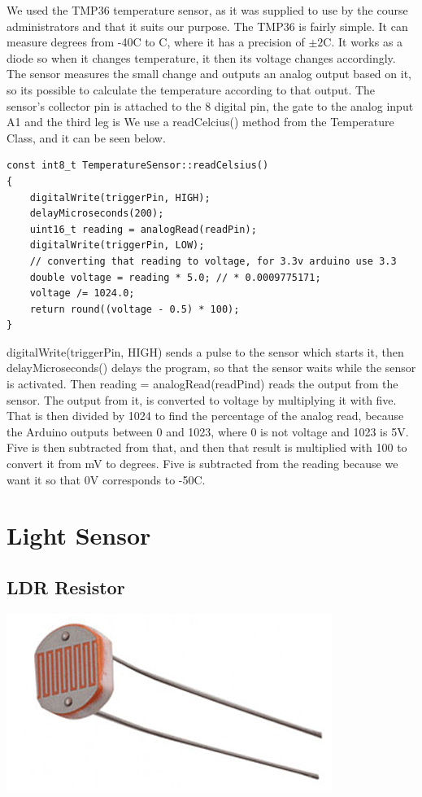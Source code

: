 \documentclass[a4paper,12pt,twoside,openright,titlepage]{book}
\begin{document}
We used the TMP36 temperature sensor, as it was supplied to use by the course administrators and that it suits our purpose. The TMP36 is fairly simple. It can measure degrees from -40\textdegree{}C to C, where it has a precision\cite{tmpTutorial} of $\pm2$\textdegree{}C. It works as a diode so when it changes temperature, it then its voltage changes accordingly. The sensor measures the small change and outputs an analog output based on it, so its possible to calculate the temperature according to that output. 
The sensor's collector pin is attached to the 8 digital pin, the gate to the analog input A1 and the third leg is 
We use a readCelcius() method from the Temperature Class, and it can be seen below.
\begin{lstlisting}[language=Arduino]
const int8_t TemperatureSensor::readCelsius()
{
    digitalWrite(triggerPin, HIGH);
    delayMicroseconds(200);
    uint16_t reading = analogRead(readPin);
    digitalWrite(triggerPin, LOW);
    // converting that reading to voltage, for 3.3v arduino use 3.3
    double voltage = reading * 5.0; // * 0.0009775171;
    voltage /= 1024.0;
    return round((voltage - 0.5) * 100);
}
\end{lstlisting}
digitalWrite(triggerPin, HIGH) sends a pulse to the sensor which starts it, then delayMicroseconds() delays the program, so that the sensor waits while the sensor is activated. Then reading = analogRead(readPind) reads the output from the sensor. The output from it, is converted to voltage by multiplying it with five. That is then divided by 1024 to find the percentage of the analog read, because the Arduino outputs between 0 and 1023, where 0 is not voltage and 1023 is 5V. Five is then subtracted from that, and then that result is multiplied with 100 to convert it from mV to degrees. Five is subtracted from the reading because we want it so that 0V corresponds to -50\textdegree{}C. 

\section{Light Sensor}
\subsection{LDR Resistor}

\begin{center}
	\includegraphics[scale=0.80]{LDR-Resistor}
\end{center}
\end{document}
